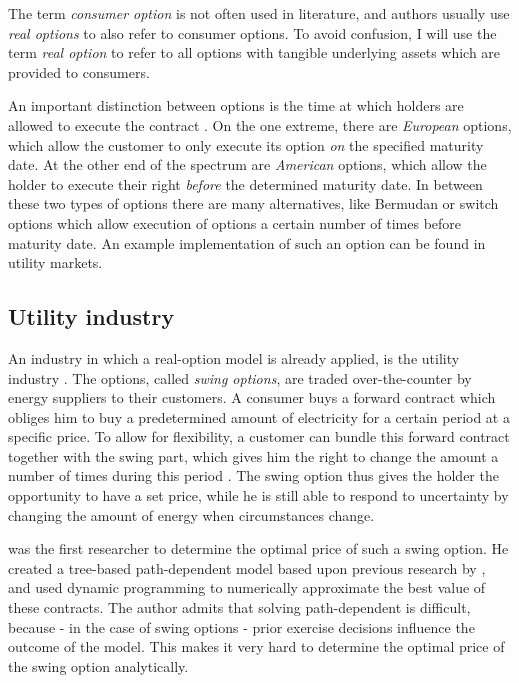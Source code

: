 The term \emph{consumer option} is not often used in literature, and authors usually use \emph{real options} to also refer to consumer options. To avoid confusion, I will use the term \emph{real option} to refer to all options with tangible underlying assets which are provided to consumers.

An important distinction between options is the time at which holders are allowed to execute the contract \cite{hull99}. On the one extreme, there are \emph{European} options, which allow the customer to only execute its option \emph{on} the specified maturity date. At the other end of the spectrum are \emph{American} options, which allow the holder to execute their right \emph{before} the determined maturity date. In between these two types of options there are many alternatives, like Bermudan or switch options which allow execution of options a certain number of times before maturity date. An example implementation of such an option can be found in utility markets.

\subsection{Utility industry}
An industry in which a real-option model is already applied, is the utility industry \cite{keppo2004pricing}. The options, called \emph{swing options}, are traded over-the-counter by energy suppliers to their customers. A consumer buys a forward contract which obliges him to buy a predetermined amount of electricity for a certain period at a specific price. To allow for flexibility, a customer can bundle this forward contract together with the swing part, which gives him the right to change the amount a number of times during this period \cite{jaillet2004valuation}. The swing option thus gives the holder the opportunity to have a set price, while he is still able to respond to uncertainty by changing the amount of energy when circumstances change.

 was the first researcher to determine the optimal price of such a swing option. He created a tree-based path-dependent  model based upon previous research by , and used dynamic programming to numerically approximate the best value of these contracts. The author admits that solving path-dependent is difficult, because - in the case of swing options - prior exercise decisions influence the outcome of the model. This makes it very hard to determine the optimal price of the swing option analytically.

